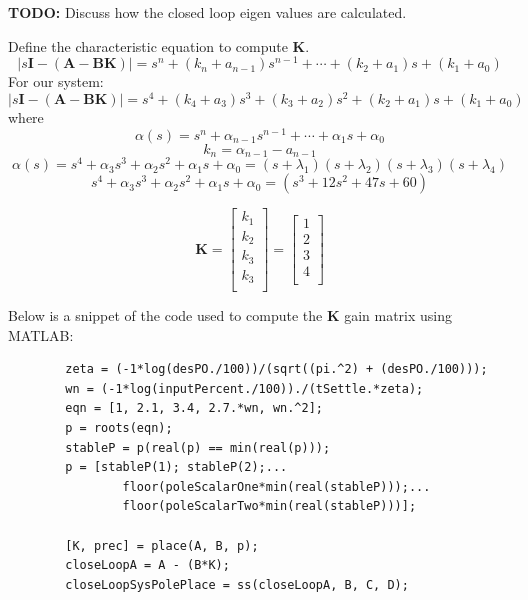 \documentclass[titlepage]{article}
\begin{document}
	\textbf{TODO:} Discuss how the closed loop eigen values are calculated.

	Define the characteristic equation to compute \textbf{K}.
	\[\left| s\textbf{I} - \left(\textbf{A} - \textbf{B}\textbf{K}\right)\right| = s^{n} + \left(k_{n}+a_{n-1}\right)s^{n-1}+ \cdots +\left(k_{2}+a_{1}\right)s+\left(k_{1}+a_{0}\right)\]
	For our system:
	\[\left| s\textbf{I} - \left(\textbf{A} - \textbf{B}\textbf{K}\right)\right| = s^{4}+ \left(k_{4}+a_{3}\right)s^{3} + \left(k_{3}+a_{2}\right)s^{2}+ \left(k_{2}+a_{1}\right)s+\left(k_{1}+a_{0}\right)\]
	where
	\[\alpha\left(s\right) = s^{n} + \alpha_{n-1}s^{n-1}+ \cdots +\alpha_{1}s+\alpha_{0}\]
	\[k_{n} = \alpha_{n-1} - a_{n-1}\]
	\[\alpha\left(s\right) = s^{4} + \alpha_{3}s^{3}+ \alpha_{2}s^{2} + \alpha_{1}s +\alpha_{0} = \left(s+\lambda_{1}\right)\left(s+\lambda_{2}\right)\left(s+\lambda_{3}\right)\left(s+\lambda_{4}\right)\]
	\[s^{4} + \alpha_{3}s^{3} + \alpha_{2}s^{2} + \alpha_{1}s +\alpha_{0} =\left(s^3+12s^2+47s+60\right)\]

	\[\textbf{K} = \begin{bmatrix}
		k_1\\
		k_2\\
		k_3\\
		k_3\\
	\end{bmatrix} = \begin{bmatrix}
		1\\
		2\\
		3\\
		4\\
	\end{bmatrix}\]

	Below is a snippet of the code used to compute the \textbf{K} gain matrix using MATLAB:
	\begin{lstlisting}[style=Matlab-editor]
		%% Pole Placement
		zeta = (-1*log(desPO./100))/(sqrt((pi.^2) + (desPO./100)));
		wn = (-1*log(inputPercent./100))./(tSettle.*zeta);
		eqn = [1, 2.1, 3.4, 2.7.*wn, wn.^2];
		p = roots(eqn);
		stableP = p(real(p) == min(real(p)));
		p = [stableP(1); stableP(2);...
		        floor(poleScalarOne*min(real(stableP)));...
		        floor(poleScalarTwo*min(real(stableP)))];

		[K, prec] = place(A, B, p);
		closeLoopA = A - (B*K);
		closeLoopSysPolePlace = ss(closeLoopA, B, C, D);
	\end{lstlisting}
\end{document}
